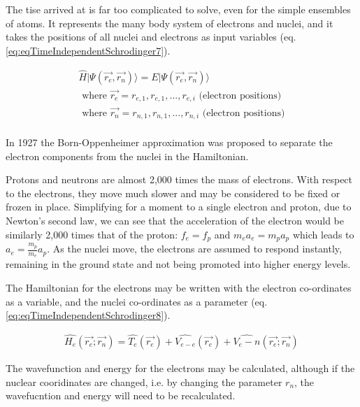 The \acrshort{tise} arrived at is far too complicated to solve, even for the simple ensembles of atoms.  It represents the many body system of electrons and nuclei, and it takes the positions of all nuclei and electrons as input variables (eq. \ref{eq:eqTimeIndependentSchrodinger7}).

\begin{equation}
\begin{split}
\hat{H} \lvert \Psi (\vec{r_e}, \vec{r_n}) \rangle = E \lvert \Psi (\vec{r_e}, \vec{r_n}) \rangle \\
\text{ where } \vec{r_e} = r_{e,1}, r_{e,1},...,r_{e,i} \text{ (electron positions)} \\
\text{ where } \vec{r_n} = r_{n,1}, r_{n,1},...,r_{n,i} \text{ (electron positions)} \\
\end{split}
\label{eq:eqTimeIndependentSchrodinger7}
\end{equation}

In 1927 the Born-Oppenheimer approximation was proposed to separate the electron components from the nuclei in the Hamiltonian.  

Protons and neutrons are almost 2,000 times the mass of electrons.  With respect to the electrons, they move much slower and may be considered to be fixed or frozen in place.  Simplifying for a moment to a single electron and proton, due to Newton's second law, we can see that the acceleration of the electron would be similarly 2,000 times that of the proton: $f_e = f_p$ and $m_e a_e = m_p a_p$ which leads to $a_e = \frac{m_p}{m_e} a_p$.  As the nuclei move, the electrons are assumed to respond instantly, remaining in the ground state and not being promoted into higher energy levels.

The Hamiltonian for the electrons may be written with the electron co-ordinates as a variable, and the nuclei co-ordinates as a parameter (eq. \ref{eq:eqTimeIndependentSchrodinger8}).

\begin{equation}
\begin{split}
\hat{H_e} (\vec{r_e}; \vec{r_n}) = \hat{T_e}(\vec{r_e}) + \hat{V_{e-e}}(\vec{r_e}) + \hat{V_e-n}(\vec{r_e}; \vec{r_n})
\end{split}
\label{eq:eqTimeIndependentSchrodinger8}
\end{equation}

The wavefunction and energy for the electrons may be calculated, although if the nuclear cooridinates are changed, i.e. by changing the parameter $r_n$, the wavefucntion and energy will need to be recalculated.

